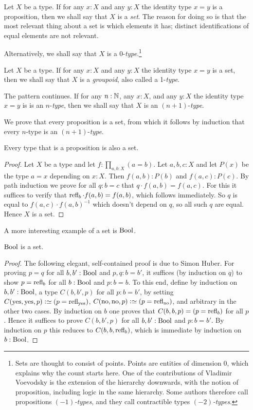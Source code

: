 Let $X$ be a type.  If for any $x:X$ and any $y:X$ the identity 
type $x=y$ is a proposition, then we shall say that $X$ is a \emph{set}.
The reason for doing so is that the most relevant
thing about a set is which elements it has; distinct identifications
of equal elements are not relevant.

Alternatively, we shall say that $X$ is a 0-\emph{type}.\footnote{%
Sets are thought to consist of points. Points are entities of dimension 0, 
which explains why the count starts here.
One of the contributions of Vladimir Voevodsky is the extension of
the hierarchy downwards, with the notion of proposition,
including logic in the same hierarchy.
Some authors therefore call propositions \emph{$(-1)$-types}, and they call contractible types {\em $(-2)$-types}.} 

Let $X$ be a type.  If for any $x:X$ and any $y:X$ the identity type $x=y$ is a set, 
 then we shall say that $X$ is a \emph{groupoid}, also called a 1-\emph{type}.

The pattern continues.  If for any $n:\mathbb{N}$, any $x:X$, and any $y:X$ 
the identity type $x=y$ is is an $n$-\emph{type}, 
then we shall say that $X$ is an $(n+1)$-\emph{type}.

We prove that every proposition is a set, from which it follows
by induction that every $n$-type is an $(n+1)$-\emph{type}.

\begin{lemma}\label{lem:prop-is-set}
Every type that is a proposition is also a set.
\end{lemma}
\begin{proof}
Let $X$ be a type and let $f: \prod_{a,b:X} (a=b)$. Let $a,b,c : X$ and
let $P(x)$ be the type $a=x$ depending on $x:X$. Then
$f(a,b):P(b)$ and $f(a,c):P(c)$. By path induction we prove for
all $q:b=c$ that $q\cdot f(a,b) = f(a,c)$. For this it suffices to
verify that $\refl{b} \cdot f(a,b) = f(a,b)$, which follows immediately.
So $q$ is equal to $f(a,c)\cdot f(a,b)^{-1}$ which doesn't
depend on $q$, so all such $q$ are equal. Hence $X$ is a set.
\end{proof}

A more interesting example of a set is $\mathrm{Bool}$.

\begin{lemma}\label{lem:isset-bool}
$\mathrm{Bool}$ is a set.
\end{lemma}
\begin{proof}
The following elegant, self-contained proof is due to Simon Huber.
For proving $p=q$ for all $b,b':\mathrm{Bool}$ and $p,q: b=b'$,
it suffices (by induction on $q$) to show
$p=\refl{b}$ for all $b:\mathrm{Bool}$ and $p: b=b$.
To this end, define by induction on $b,b':\mathrm{Bool}$,
a type $C(b,b',p)$ for all $p: b=b'$, by setting
$C(\yes,\yes,p)\defeq (p=\refl{\yes})$,
$C(\no,\no,p)\defeq (p=\refl{\no})$,
and arbitrary in the other two cases.
By induction on $b$ one proves that $C(b,b,p)=(p=\refl{b})$ for all $p$. 
Hence it suffices to prove $C(b,b',p)$ for all $b,b':\mathrm{Bool}$
and $p: b=b'$. By induction on $p$ this reduces to
$C(b,b,\refl{b})$, which is immediate by induction on $b:\mathrm{Bool}$.
\end{proof}

